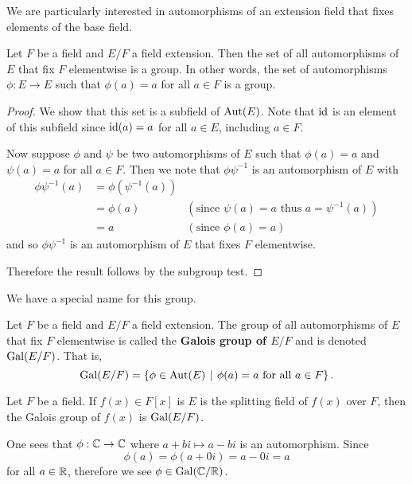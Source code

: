 We are particularly interested in automorphisms of an extension field that fixes elements of the base field.
\begin{proposition}\label{prop-galois-group-is-indeed-group}
    Let $F$ be a field and $E/F$ a field extension. Then the set of all automorphisms of $E$ that fix $F$ elementwise is a group. In other words, the set of automorphisms $\phi: E \to E$ such that $\phi(a) = a$ for all $a \in F$ is a group.
\end{proposition}
\begin{proof}
    We show that this set is a subfield of $\mathrm{Aut}(E)$. Note that $\mathrm{id}$ is an element of this subfield since $\mathrm{id}(a) = a$ for all $a \in E$, including $a \in F$.

    Now suppose $\phi$ and $\psi$ be two automorphisms of $E$ such that $\phi(a) = a$ and $\psi(a) = a$ for all $a \in F$. Then we note that $\phi\psi^{-1}$ is an automorphism of $E$ with
    \begin{align*}
        \phi\psi^{-1}(a) &= \phi(\psi^{-1}(a))\\
        &= \phi(a) & (\text{since }\psi(a) = a \text{ thus } a = \psi^{-1}(a))\\
        &= a & (\text{since }\phi(a) = a)
    \end{align*}
    and so $\phi\psi^{-1}$ is an automorphism of $E$ that fixes $F$ elementwise.

    Therefore the result follows by the subgroup test.
\end{proof}

We have a special name for this group.
\begin{definition}
    Let $F$ be a field and $E/F$ a field extension. The group of all automorphisms of $E$ that fix $F$ elementwise is called the \textbf{Galois group of $E/F$} and is denoted $\mathrm{Gal}(E/F)$. That is,
    \[
        \Gal{E/F} = \left\{\phi \in \Aut{E} \vert \phi(a) = a \text{ for all } a \in F\right\}.
    \]
\end{definition}
\begin{remark}
    Let $F$ be a field. If $f(x) \in F[x]$ is $E$ is the splitting field of $f(x)$ over $F$, then the Galois group of $f(x)$ is $\mathrm{Gal}(E/F)$.
\end{remark}

\begin{example}
    One sees that $\phi: \mathbb{C} \to \mathbb{C}$ where $a+bi \mapsto a - bi$ is an automorphism. Since
    \[
        \phi(a) = \phi(a + 0i) = a - 0i = a
    \]
    for all $a \in \mathbb{R}$, therefore we see $\phi \in \mathrm{Gal}(\mathbb{C}/\mathbb{R})$.
\end{example}

